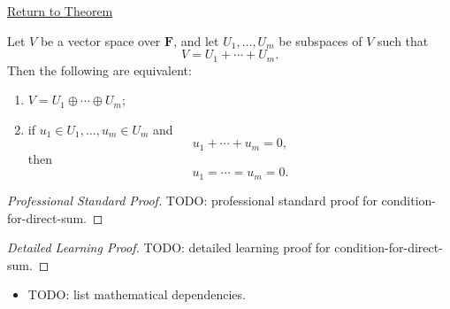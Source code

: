 \newpage
{}
\label{prf:condition-for-direct-sum}

\begin{remark*}[Return]
\hyperref[thm:condition-for-direct-sum]{Return to Theorem}
\end{remark*}

\begin{theorem*}
Let $V$ be a vector space over $\mathbf{F}$, and let
$U_1,\dots,U_m$ be subspaces of $V$ such that
\[
V=U_1+\cdots+U_m.
\]
Then the following are equivalent:
\begin{enumerate}[label=(\roman*)]
  \item \(V=U_1\oplus\cdots\oplus U_m\);
  \item if \(u_1 \in U_1,\dots,u_m \in U_m\) and
        \[
        u_1+\cdots+u_m=0,
        \]
        then
        \[
        u_1=\cdots=u_m=0.
        \]
\end{enumerate}
\end{theorem*}

\begin{proof}[Professional Standard Proof]
\LRAProofBodyStart
TODO: professional standard proof for condition-for-direct-sum.
\end{proof}

\begin{proof}[Detailed Learning Proof]
\LRAProofBodyStart
TODO: detailed learning proof for condition-for-direct-sum.
\end{proof}

\begin{remark*}
\end{remark*}

\begin{dependencies}
\begin{itemize}
  \item TODO: list mathematical dependencies.
\end{itemize}
\end{dependencies}

\clearpage
